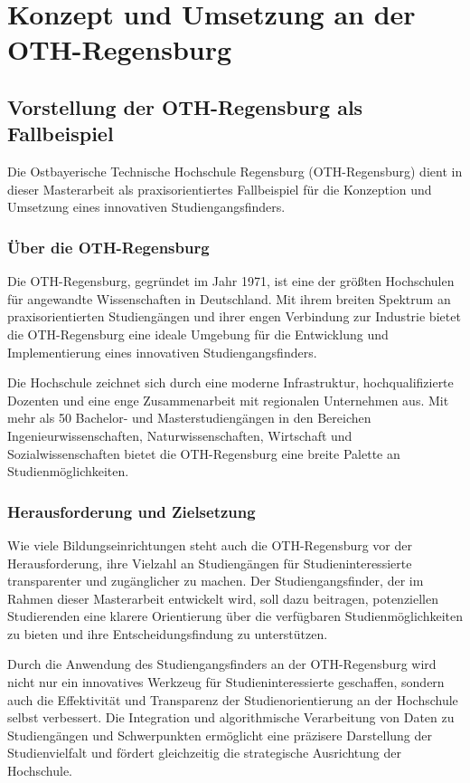 \section{Konzept und Umsetzung an der OTH-Regensburg}
\subsection{Vorstellung der OTH-Regensburg als Fallbeispiel}
Die Ostbayerische Technische Hochschule Regensburg (OTH-Regensburg) dient in
dieser Masterarbeit als praxisorientiertes Fallbeispiel für die Konzeption und 
Umsetzung eines innovativen Studiengangsfinders.

\subsubsection{Über die OTH-Regensburg}
Die OTH-Regensburg, gegründet im Jahr 1971, ist eine der größten Hochschulen
für angewandte Wissenschaften in Deutschland. Mit ihrem breiten Spektrum an 
praxisorientierten Studiengängen und ihrer engen Verbindung zur Industrie bietet
die OTH-Regensburg eine ideale Umgebung für die Entwicklung und Implementierung
eines innovativen Studiengangsfinders. \parencite{ueber-die-oth}

Die Hochschule zeichnet sich durch eine moderne Infrastruktur, hochqualifizierte 
Dozenten und eine enge Zusammenarbeit mit regionalen Unternehmen aus. Mit mehr
als 50 Bachelor- und Masterstudiengängen in den Bereichen
Ingenieurwissenschaften, Naturwissenschaften, Wirtschaft und
Sozialwissenschaften bietet die OTH-Regensburg eine breite Palette an 
Studienmöglichkeiten. \parencite{ueber-die-oth}

\subsubsection{Herausforderung und Zielsetzung}
Wie viele Bildungseinrichtungen steht auch die OTH-Regensburg vor der
Herausforderung, ihre Vielzahl an Studiengängen für Studieninteressierte
transparenter und zugänglicher zu machen. Der Studiengangsfinder, der im Rahmen
dieser Masterarbeit entwickelt wird, soll dazu beitragen, potenziellen
Studierenden eine klarere Orientierung über die verfügbaren Studienmöglichkeiten
zu bieten und ihre Entscheidungsfindung zu unterstützen.

Durch die Anwendung des Studiengangsfinders an der OTH-Regensburg wird nicht nur
ein innovatives Werkzeug für Studieninteressierte geschaffen, sondern auch die 
Effektivität und Transparenz der Studienorientierung an der Hochschule selbst 
verbessert. Die Integration und algorithmische Verarbeitung von Daten zu 
Studiengängen und Schwerpunkten ermöglicht eine präzisere Darstellung der 
Studienvielfalt und fördert gleichzeitig die strategische Ausrichtung der
Hochschule.

